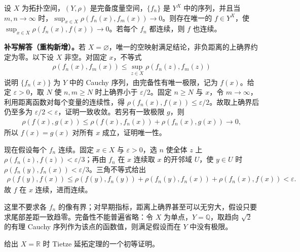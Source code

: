 \documentclass[../../main.tex]{subfiles}%
\begin{document}
\begin{exercise}\label{exercise:ch04-uniform-metric-target}
设 $X$ 为拓扑空间，$(Y,\rho)$ 是完备度量空间，$\{f_n\}$ 是 $Y^X$ 中的序列，并且当 $m,n\to\infty$ 时，$\sup_{x\in X}\rho(f_n(x),f_m(x))\to0$。则存在唯一的 $f\in Y^X$，使 $\sup_{x\in X}\rho(f_n(x),f(x))\to0$。若每个 $f_n$ 都连续，则 $f$ 也连续。
\end{exercise}
\begin{solution}
\textbf{补写解答（重构新增）。}若 $X=\varnothing$，唯一的空映射满足结论，非负距离的上确界约定为零。以下设 $X$ 非空。对固定 $x$，不等式
\begin{align*}
\rho(f_n(x),f_m(x))\le\sup_{z\in X}\rho(f_n(z),f_m(z))
\end{align*}
说明 $\{f_n(x)\}$ 为 $Y$ 中的 Cauchy 序列，由完备性有唯一极限，记为 $f(x)$。给定 $\varepsilon>0$，取 $N$ 使 $n,m\ge N$ 时上确界小于 $\varepsilon/2$。固定 $n\ge N$ 与 $x$，令 $m\to\infty$，利用距离函数对每个变量的连续性，得 $\rho(f_n(x),f(x))\le\varepsilon/2$。故取上确界后仍至多为 $\varepsilon/2<\varepsilon$，证明一致收敛。若另有一致极限 $g$，则
\begin{align*}
\rho(f(x),g(x))\le\rho(f(x),f_n(x))+\rho(f_n(x),g(x))\longrightarrow0,
\end{align*}
所以 $f(x)=g(x)$ 对所有 $x$ 成立，证明唯一性。

现在假设每个 $f_n$ 连续。固定 $x\in X$ 与 $\varepsilon>0$，选 $n$ 使全体 $z$ 上 $\rho(f_n(z),f(z))<\varepsilon/3$；再由 $f_n$ 在 $x$ 连续取 $x$ 的开邻域 $U$，使 $y\in U$ 时 $\rho(f_n(y),f_n(x))<\varepsilon/3$。三角不等式给出
\begin{align*}
\rho(f(y),f(x))
\le\rho(f(y),f_n(y))+\rho(f_n(y),f_n(x))+\rho(f_n(x),f(x))
<\varepsilon.
\end{align*}
故 $f$ 在 $x$ 连续，进而连续。

这里不要求各 $f_n$ 的像有界；对早期指标，距离上确界甚至可以无穷大，假设只要求尾部差距一致趋零。完备性不能普遍省略：令 $X$ 为单点，$Y=\mathbb Q$，取趋向 $\sqrt2$ 的有理 Cauchy 序列作为该点的函数值，则满足假设而在 $Y$ 中没有极限。
\end{solution}
\begin{exercise}\label{exercise:ch04-tietze-real-line}
给出 $X=\mathbb R$ 时 Tietze 延拓定理的一个初等证明。
\end{exercise}
\end{document}
